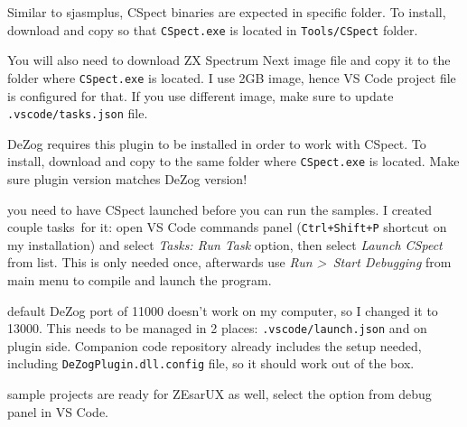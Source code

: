 \documentclass[12pt,twoside,openright,a4paper]{book}
\begin{document}
\begin{description}[style=unboxed,leftmargin=0cm]
	Similar to sjasmplus, CSpect binaries are expected in specific folder. To install, download and copy so that {\tt CSpect.exe} is located in {\tt Tools/CSpect} folder.

	\item[CSpect Next Image (\url{http://www.zxspectrumnext.online/#sd})]\hfill

	You will also need to download ZX Spectrum Next image file and copy it to the folder where {\tt CSpect.exe} is located. I use 2GB image, hence VS Code project file is configured for that. If you use different image, make sure to update {\tt .vscode/tasks.json} file.
	
	\item[DeZog CSpect plugin (\url{https://github.com/maziac/DeZogPlugin})]\hfill

	DeZog requires this plugin to be installed in order to work with CSpect. To install, download and copy to the same folder where {\tt CSpect.exe} is located. Make sure plugin version matches DeZog version!

\end{description}

{
	\footnotesize

	\begin{description}[topsep=1pt,itemsep=1pt,labelindent=0pt,leftmargin=0pt]		
		\item[Note:] you need to have CSpect launched before you can run the samples. I created couple tasks\footnotemark~for it: open VS Code commands panel ({\tt Ctrl+Shift+P} shortcut on my installation) and select \textit{Tasks: Run Task} option, then select \textit{Launch CSpect} from list. This is only needed once, afterwards use \textit{Run \textgreater ~Start Debugging} from main menu to compile and launch the program.

		\item[Note:] default DeZog port of 11000 doesn't work on my computer, so I changed it to 13000. This needs to be managed in 2 places: {\tt .vscode/launch.json} and on plugin side. Companion code repository already includes the setup needed, including {\tt DeZogPlugin.dll.config} file, so it should work out of the box.
	
		\item[Note:] sample projects are ready for ZEsarUX as well, select the option from debug panel in VS Code.
	\end{description}
}

\end{document}

